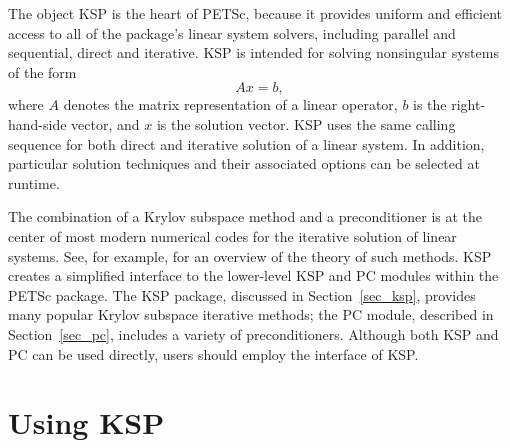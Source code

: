 The object KSP is the heart of PETSc, because it provides uniform and efficient access 
to all of the package's linear system solvers, including parallel and sequential,
direct and iterative.
KSP is intended for solving nonsingular systems of the form
\begin{equation}
   A x = b,
\label{eq_Ax=b}
\end{equation}
where $ A$ denotes the matrix representation of a linear operator, $b$
is the right-hand-side vector, and $ x $ is the solution vector.  KSP
uses the same calling sequence for both direct and iterative solution
of a linear system.  In addition, particular solution techniques and
their associated options can be selected at runtime.

The combination of a Krylov subspace method and a preconditioner is at
the center of most modern numerical codes for the iterative solution of
linear systems.  See, for example, \cite{fgn} for an overview of the theory
of such methods.  KSP creates a simplified interface to the
lower-level KSP and PC modules within the PETSc package.  The KSP package,
discussed in
Section~\ref{sec_ksp}, provides many popular Krylov
 subspace iterative methods;
the PC module, described in Section~\ref{sec_pc}, includes a
variety of preconditioners.  Although both  KSP and PC can be used
directly, users should employ the interface of KSP.

\section{Using KSP} 
\label{sec_usingsles}

